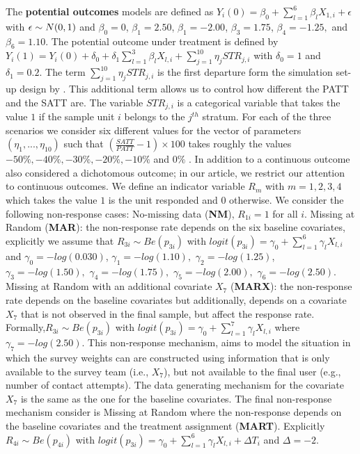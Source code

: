 \documentclass[oupdraft]{bio}
\begin{document}
The \textbf{potential outcomes} models are defined as 
$Y_{i}\left(0\right)=\beta_{0}+\sum_{l=1}^{6}\beta_{l}X_{1,i}+\epsilon$ with $\epsilon\sim N\text{\ensuremath{\left(0,1\right)}}$ and $\beta_{0}=0$, $\beta_{1}=2.50$, $\beta_{1}=-2.00$, $\beta_{3}=1.75$,
$\beta_{4}=-1.25,$ and $\beta_{6}=1.10$. The potential outcome under
treatment is defined by $Y_{i}\left(1\right)=Y_{i}\left(0\right)+\delta_{0}+\delta_{1}\sum_{l=1}^{3}\beta_{l}X_{l,i}+\sum_{j=1}^{10}\eta_{j}STR_{j,i}$ with $\delta_{0}=1$ and $\delta_{1}=0.2$. The term $\sum_{j=1}^{10}\eta_{j}STR_{j,i}$ is the first departure form the simulation set-up design by \citet{austin2016propensity}. This additional term allows us to control how different  the PATT and the SATT are. The variable $STR_{j,i}$ is a categorical variable that takes the value $1$ if the sample unit $i$ belongs to the $j^{th}$ stratum.  For each of the three scenarios we consider six different values for the vector of parameters $\left(\eta_{1},...,\eta_{10}\right)$ such that $\left(\frac{SATT}{PATT}-1\right)\times100$ takes roughly the values $-50\%, -40\%, -30\%, -20\%, -10\%$ and $0\%$ . 
In addition to a continuous outcome \citet{austin2016propensity} also considered a dichotomous outcome; in our article, we restrict our attention to continuous outcomes.  
We define an indicator variable $R_{m}$ with $m=1,2,3,4$ which takes the value $1$ is the unit responded and $0$ otherwise.  
We consider the following non-response cases: No-missing data (\textbf{NM}), $R_{1i}=1$ for all $i$. Missing at Random (\textbf{MAR}): the non-response rate depends on the six baseline covariates, explicitly we assume that $R_{3i}\sim Be(p_{3i})$ with
$logit\left(p_{3i}\right)=\gamma_{0}+\sum_{l=1}^{6}\gamma_{l}X_{l,i}$ and $\gamma_{0}=-log(0.030)$, $\gamma_{1}=-log(1.10),$ $\gamma_{2}=-log(1.25)$,
$\gamma_{3}=-log(1.50),$ $\gamma_{4}=-log(1.75),$ $\gamma_{5}=-log(2.00),$
$\gamma_{6}=-log(2.50)$. Missing at Random with an additional covariate $X_{7}$ (\textbf{MARX}): the non-response rate depends on the baseline covariates but additionally, depends on a covariate $X_{7}$ that is not observed in the final sample, but affect the response rate. Formally,$R_{3i}\sim Be(p_{3i})$ with $logit\left(p_{3i}\right)=\gamma_{0}+\sum_{l=1}^{7}\gamma_{l}X_{l,i}$ where $\gamma_{7} = -log(2.50)$. This non-response mechanism, aims to model the situation in which the survey weights can are constructed using information that is only available to the survey team (i.e., $X_{7}$), but not available to the final user (e.g., number of contact attempts). The data generating mechanism for the covariate $X_{7}$ is the same as the one for the baseline covariates. The final non-response mechanism consider is Missing at Random where the non-response depends on the baseline covariates and the treatment assignment (\textbf{MART}). Explicitly $R_{4i}\sim Be(p_{4i})$ with $logit\left(p_{3i}\right)=\gamma_{0}+\sum_{l=1}^{6}\gamma_{l}X_{l,i}+\Delta T_{i}$ and $\Delta=-2$.
\end{document}
